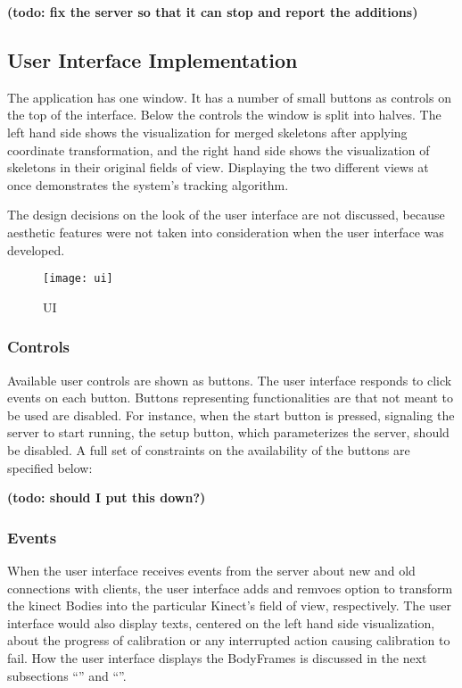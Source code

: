 \textbf{(todo: fix the server so that it can stop and report the additions)}

\subsection{User Interface Implementation}

The application has one window. It has a number of small buttons as controls on the top of the interface. Below the controls the window is split into halves. The left hand side shows the visualization for merged skeletons after applying coordinate transformation, and the right hand side shows the visualization of skeletons in their original fields of view. Displaying the two different views at once demonstrates the system's tracking algorithm.

The design decisions on the look of the user interface are not discussed, because aesthetic features were not taken into consideration when the user interface was developed.

\begin{figure}[h!]
  \centering
  \texttt{[image: ui]}
  \caption{UI}
  \label{fig:ui}
\end{figure}

\subsubsection{Controls}

Available user controls are shown as buttons. The user interface responds to click events on each button. Buttons representing functionalities are that not meant to be used are disabled. For instance, when the start button is pressed, signaling the server to start running, the setup button, which parameterizes the server, should be disabled. A full set of constraints on the availability of the buttons are specified below:

\textbf{(todo: should I put this down?)}

\subsubsection{Events}

When the user interface receives events from the server about new and old connections with clients, the user interface adds and remvoes option to transform the kinect Bodies into the particular Kinect's field of view, respectively. The user interface would also display texts, centered on the left hand side visualization, about the progress of calibration or any interrupted action causing calibration to fail. How the user interface displays the BodyFrames is discussed in the next subsections  ``'' and ``''.


